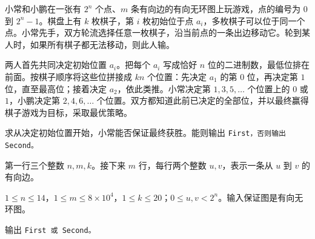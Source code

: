 \Legend
小常和小鹏在一张有 $2^n$ 个点、$m$ 条有向边的有向无环图上玩游戏，点的编号为 $0$ 到 $2^n-1$。棋盘上有 $k$ 枚棋子，第 $i$ 枚初始位于点 $a_i$，多枚棋子可以位于同一个点。小常先手，双方轮流选择任意一枚棋子，沿当前点的一条出边移动它。轮到某人时，如果所有棋子都无法移动，则此人输。

两人首先共同决定初始位置 $a_i$。把每个 $a_i$ 写成恰好 $n$ 位的二进制数，最低位排在前面。按棋子顺序将这些位拼接成 $k n$ 个位置：先决定 $a_1$ 的第 $0$ 位，再决定第 $1$ 位，直至最高位；接着决定 $a_2$，依此类推。小常决定第 $1,3,5,\ldots$ 个位置上的 $0$ 或 $1$，小鹏决定第 $2,4,6,\ldots$ 个位置。双方都知道此前已决定的全部位，并以最终赢得棋子游戏为目标，采取最优策略。

求从决定初始位置开始，小常能否保证最终获胜。能则输出 \tt{First}，否则输出 \tt{Second}。

\Input

第一行三个整数 $n,m,k$。接下来 $m$ 行，每行两个整数 $u,v$，表示一条从 $u$ 到 $v$ 的有向边。

$1\le n\le14$，$1\le m\le 8\times10^4$，$1\le k\le20$；$0\le u,v<2^n$。输入保证图是有向无环图。

\Output

输出 \tt{First} 或 \tt{Second}。

\Examples

\begin{example}
\end{example}

\begin{example}
\end{example}

\begin{example}
\end{example}
